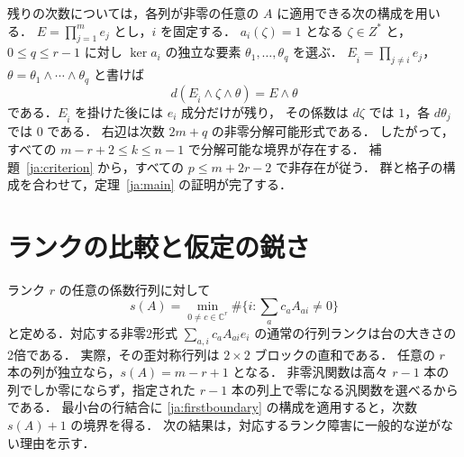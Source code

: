 \documentclass[12pt]{amsart}
\theoremstyle{definition}
\theoremstyle{remark}
\numberwithin{equation}{section}
\newcommand{\C}{\mathbb{C}}
\begin{document}
残りの次数については，各列が非零の任意の $A$ に適用できる次の構成を用いる．
$E=\prod_{j=1}^m e_j$ とし，$i$ を固定する．
$a_i(\zeta)=1$ となる $\zeta\in Z^*$ と，$0\leq q\leq r-1$ に対し
$\ker a_i$ の独立な要素 $\theta_1,\ldots,\theta_q$ を選ぶ．
$E_{\widehat i}=\prod_{j\ne i}e_j$，$\theta=\theta_1\wedge\cdots\wedge\theta_q$ と書けば
\begin{equation}\label{ja:topboundary}
 d(E_{\widehat i}\wedge\zeta\wedge\theta)=E\wedge\theta
\end{equation}
である．$E_{\widehat i}$ を掛けた後には $e_i$ 成分だけが残り，
その係数は $d\zeta$ では $1$，各 $d\theta_j$ では $0$ である．
右辺は次数 $2m+q$ の非零分解可能形式である．
したがって，すべての $m-r+2\leq k\leq n-1$ で分解可能な境界が存在する．
補題~\ref{ja:criterion} から，すべての $p\leq m+2r-2$ で非存在が従う．
群と格子の構成を合わせて，定理~\ref{ja:main} の証明が完了する．

\section{ランクの比較と仮定の鋭さ}
ランク $r$ の任意の係数行列に対して
\[
 s(A)=\min_{0\ne c\in\C^r}
       \#\{i:\textstyle\sum_a c_a A_{ai}\ne0\}
\]
と定める．対応する非零2形式 $\sum_{a,i}c_aA_{ai}e_i$ の通常の行列ランクは台の大きさの2倍である．
実際，その歪対称行列は $2\times2$ ブロックの直和である．
任意の $r$ 本の列が独立なら，$s(A)=m-r+1$ となる．
非零汎関数は高々 $r-1$ 本の列でしか零にならず，指定された $r-1$ 本の列上で零になる汎関数を選べるからである．
最小台の行結合に \eqref{ja:firstboundary} の構成を適用すると，次数 $s(A)+1$ の境界を得る．
次の結果は，対応するランク障害に一般的な逆がない理由を示す．
\end{document}
